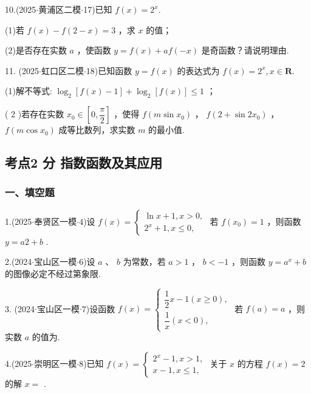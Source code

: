 10.(2025$\cdot$黄浦区二模$\cdot$17)已知 $f\left( x\right)  = {2}^{x}$.

(1)若 $f\left( x\right)  - f\left( {2 - x}\right)  = 3$ ，求 $x$ 的值；

(2)是否存在实数 $a$ ，使函数 $y = f\left( x\right)  + {af}\left( {-x}\right)$ 是奇函数？请说明理由.

11. (2025$\cdot$虹口区二模$\cdot$18)已知函数 $y = f\left( x\right)$ 的表达式为 $f\left( x\right)  = {2}^{x},x \in  \mathbf{R}$.

(1)解不等式: ${\log }_{2}\left\lbrack  {f\left( x\right)  - 1}\right\rbrack   + {\log }_{2}\left\lbrack  {f\left( x\right) }\right\rbrack   \leq  1$ ；

( 2 )若存在实数 ${x}_{0} \in  \left\lbrack  {0,\dfrac{\pi }{2}}\right\rbrack$ ，使得 $f\left( {m\sin {x}_{0}}\right)$ ， $f\left( {2 + \sin {2{x}_{0}}}\right)$ ， $f\left( {m\cos {x}_{0}}\right)$ 成等比数列，求实数 $m$ 的最小值.

\subsection*{考点2 分 指数函数及其应用}

\subsubsection*{一、填空题}

1.(2025$\cdot$奉贤区一模$\cdot$4)设 $f\left( x\right)  = \left\{  \begin{array}{l} \ln x + 1,x > 0, \\  {2}^{x} + 1,x \leq  0, \end{array}\right.$ 若 $f\left( {x}_{0}\right)  = 1$ ，则函数 $y = {a2} + b$ \blkda[2]{}.

2.(2024$\cdot$宝山区一模$\cdot$6)设 $a$ 、 $b$ 为常数，若 $a > 1$ ， $b <  - 1$ ，则函数 $y = {a}^{x} + b$ 的图像必定不经过第\blkda[2]{}象限.

3. (2024$\cdot$宝山区一模$\cdot$7)设函数 $f\left( x\right)  = \left\{  \begin{array}{l} \dfrac{1}{2}x - 1\left( {x \geq  0}\right) , \\  \dfrac{1}{x}\left( {x < 0}\right) , \end{array}\right.$ 若 $f\left( a\right)  = a$ ，则实数 $a$ 的值为\blkda[2]{}.

4.(2025$\cdot$崇明区一模$\cdot$8)已知 $f\left( x\right)  = \left\{  \begin{array}{l} {2}^{x} - 1,x > 1, \\  x - 1,x \leq  1, \end{array}\right.$ 关于 $x$ 的方程 $f\left( x\right)  = 2$ 的解 $x =$ \blkda[2]{}.

